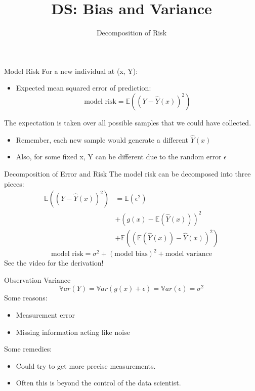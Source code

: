 \documentclass[aspectratio=169]{../latex_main/tntbeamer}  %
\title[Introduction]{DS: Bias and Variance}
\subtitle{Decomposition of Risk}
\begin{document}
	
	\maketitle
	\begin{frame}{Model Risk}
	    For a new individual at (x, Y):
	    \begin{itemize}
	        \item Expected mean squared error of prediction:
	        \begin{equation*}
	            \text{model risk} = \mathbb{E}((Y-\hat{Y}(x))^2)
	        \end{equation*}
	    \end{itemize}
	    The expectation is taken over all possible samples that we could have collected.
	    \begin{itemize}
	        \item Remember, each new sample would generate a different $\hat{Y}(x)$
	        \item Also, for some fixed x, Y can be different due to the random error $\epsilon$
	    \end{itemize}
	\end{frame}
	
	
	\begin{frame}[c]{Decomposition of Error and Risk}
	    The model risk can be decomposed into three pieces:
	    \begin{align*}
	        \mathbb{E}((Y-\hat{Y}(x))^2) &= \mathbb{E}(\epsilon^2)\\
	        &+ (g(x) - \mathbb{E}(\hat{Y}(x)))^2\\
	        &+ \mathbb{E}((\mathbb{E}(\hat{Y}(x))-\hat{Y}(x))^2)
	    \end{align*}
	    \begin{equation*}
	        \text{model risk} = \sigma^2 + (\text{model bias})^2 + \text{model variance}
	    \end{equation*}
	    See the video for the derivation!
	\end{frame}
	
	
	\begin{frame}[c]{Observation Variance}
	    \begin{equation*}
	        \mathbb{V}ar(Y) = \mathbb{V}ar(g(x) + \epsilon) = \mathbb{V}ar(\epsilon) = \sigma^2
	    \end{equation*}
	    Some reasons:
	    \begin{itemize}
	        \item Measurement error
	        \item Missing information acting like noise
	    \end{itemize}
	    \bigskip
	    Some remedies:
	    \begin{itemize}
	        \item Could try to get more precise measurements.
	        \item Often this is beyond the control of the data scientist.
	    \end{itemize}
	\end{frame}
	
\end{document}
